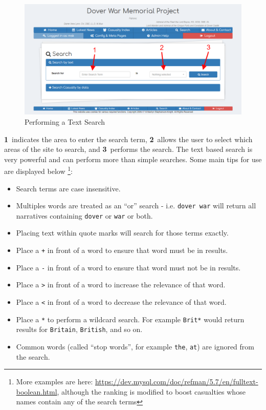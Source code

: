 \documentclass[12pt]{article}
\newcommand{\marker}[1]{\color{red}\textbf{#1}\color{black}}
\begin{document}
\begin{figure}[h]
  \centering
 \includegraphics[width=.9\textwidth]{pics/text_search.png}
	\caption{Performing a Text Search}\label{fig:text_search}
\end{figure}

\marker{1}\ indicates the area to enter the search term, \marker{2}\ allows the user to select which areas of the site to search, and \marker{3}\ performs the search. The text based search is very powerful and can perform more than simple searches. Some main tips for use are displayed below \footnote{More examples are here: \url{https://dev.mysql.com/doc/refman/5.7/en/fulltext-boolean.html}, although the ranking is modified to boost casualties whose names contain any of the search terms}:

\begin{itemize}
\item Search terms are case insensitive.
\item Multiples words are treated as an ``or'' search - i.e. \texttt{dover war} will return all narratives containing \texttt{dover} or \texttt{war} or both.
\item Placing text within quote marks will search for those terms exactly.
\item Place a \texttt{+} in front of a word to ensure that word must be in results.
\item Place a \texttt{-} in front of a word to ensure that word must not be in results.
\item Place a \texttt{>} in front of a word to increase the relevance of that word.
\item Place a \texttt{<} in front of a word to decrease the relevance of that word.
\item Place a \texttt{*} to perform a wildcard search.  For example \texttt{Brit*} would return results for  \texttt{Britain}, \texttt{British}, and so on.
\item Common words (called ``stop words'', for example \texttt{the}, \texttt{at}) are ignored from the search.
\end{itemize}
\end{document}
